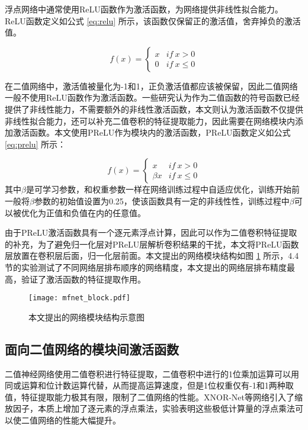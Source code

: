 浮点网络中通常使用ReLU函数作为激活函数，为网络提供非线性拟合能力。ReLU函数定义如公式 \eqref{eq:relu} 所示，该函数仅保留正的激活值，舍弃掉负的激活值。

\begin{equation}
  \label{eq:relu}
  f(x) =
  \begin{cases}
    x & if \ x > 0 \\
    0 & if \ x \leq 0
  \end{cases}
\end{equation}

在二值网络中，激活值被量化为-1和1，正负激活值都应该被保留，因此二值网络一般不使用ReLU函数作为激活函数。一些研究认为作为二值函数的符号函数已经提供了非线性能力，不需要额外的非线性激活函数，本文则认为激活函数不仅提供非线性拟合能力，还可以补充二值卷积的特征提取能力，因此需要在网络模块内添加激活函数。本文使用PReLU作为模块内的激活函数，PReLU函数定义如公式 \eqref{eq:prelu} 所示：

\begin{equation}
  \label{eq:prelu}
  f(x) =
  \begin{cases}
    x & if \ x > 0 \\
    \beta x & if \ x \leq 0
  \end{cases}
\end{equation}
其中$\beta$是可学习参数，和权重参数一样在网络训练过程中自适应优化，训练开始前一般将$\beta$参数的初始值设置为0.25，使该函数具有一定的非线性性，训练过程中$\beta$可以被优化为正值和负值在内的任意值。

由于PReLU激活函数具有一个逐元素浮点计算，因此可以作为二值卷积特征提取的补充，为了避免归一化层对PReLU层解析卷积结果的干扰，本文将PReLU函数层放置在卷积层后面，归一化层前面。本文提出的网络模块结构如图 \ref{fig:mfnet_block} 所示，4.4节的实验测试了不同网络层排布顺序的网络精度，本文提出的网络层排布精度最高，验证了激活函数的特征提取作用。

\begin{figure}[htb]
  \vspace{6pt}
  \centering
  \texttt{[image: mfnet\_block.pdf]}
  \caption{本文提出的网络模块结构示意图}
  \label{fig:mfnet_block}
\end{figure}

\subsection{面向二值网络的模块间激活函数}

二值神经网络使用二值卷积进行特征提取，二值卷积中进行的1位乘加运算可以用同或运算和位计数运算代替，从而提高运算速度，但是1位权重仅有-1和1两种取值，特征提取能力极其有限，限制了二值网络的性能。XNOR-Net\cite{xnornet}等网络引入了缩放因子，本质上增加了逐元素的浮点乘法，实验表明这些极低计算量的浮点乘法可以使二值网络的性能大幅提升。

